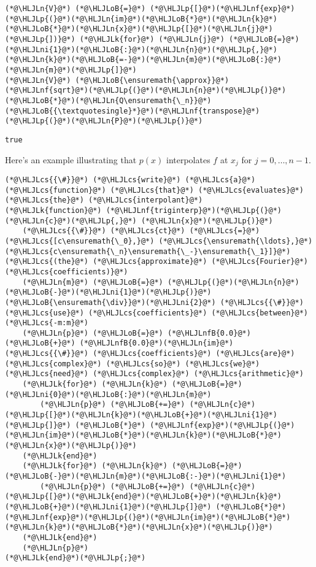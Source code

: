 \documentclass[12pt,a4paper]{article}
\newcommand{\HLJLk}[1]{\textcolor[RGB]{148,91,176}{\textbf{#1}}}
\newcommand{\HLJLn}[1]{#1}
\newcommand{\HLJLnf}[1]{\textcolor[RGB]{66,102,213}{#1}}
\newcommand{\HLJLnfB}[1]{\textcolor[RGB]{59,151,46}{#1}}
\newcommand{\HLJLni}[1]{\textcolor[RGB]{59,151,46}{#1}}
\newcommand{\HLJLoB}[1]{\textcolor[RGB]{102,102,102}{\textbf{#1}}}
\newcommand{\HLJLp}[1]{#1}
\newcommand{\HLJLcs}[1]{\textcolor[RGB]{153,153,119}{\textit{#1}}}
\begin{document}
\begin{lstlisting}
(*@\HLJLn{V}@*) (*@\HLJLoB{=}@*) (*@\HLJLp{[}@*)(*@\HLJLnf{exp}@*)(*@\HLJLp{(}@*)(*@\HLJLn{im}@*)(*@\HLJLoB{*}@*)(*@\HLJLn{k}@*)(*@\HLJLoB{*}@*)(*@\HLJLn{x}@*)(*@\HLJLp{[}@*)(*@\HLJLn{j}@*)(*@\HLJLp{])}@*) (*@\HLJLk{for}@*) (*@\HLJLn{j}@*) (*@\HLJLoB{=}@*) (*@\HLJLni{1}@*)(*@\HLJLoB{:}@*)(*@\HLJLn{n}@*)(*@\HLJLp{,}@*) (*@\HLJLn{k}@*)(*@\HLJLoB{=-}@*)(*@\HLJLn{m}@*)(*@\HLJLoB{:}@*)(*@\HLJLn{m}@*)(*@\HLJLp{]}@*)
(*@\HLJLn{V}@*) (*@\HLJLoB{\ensuremath{\approx}}@*) (*@\HLJLnf{sqrt}@*)(*@\HLJLp{(}@*)(*@\HLJLn{n}@*)(*@\HLJLp{)}@*)(*@\HLJLoB{*}@*)(*@\HLJLn{Q\ensuremath{\_n}}@*)(*@\HLJLoB{{\textquotesingle}*}@*)(*@\HLJLnf{transpose}@*)(*@\HLJLp{(}@*)(*@\HLJLn{P}@*)(*@\HLJLp{)}@*)
\end{lstlisting}

\begin{lstlisting}
true
\end{lstlisting}


Here's an example illustrating that $p(x)$ interpolates $f$ at $x_{j}$ for $j = 0, \ldots, n-1$.


\begin{lstlisting}
(*@\HLJLcs{{\#}}@*) (*@\HLJLcs{write}@*) (*@\HLJLcs{a}@*) (*@\HLJLcs{function}@*) (*@\HLJLcs{that}@*) (*@\HLJLcs{evaluates}@*) (*@\HLJLcs{the}@*) (*@\HLJLcs{interpolant}@*)
(*@\HLJLk{function}@*) (*@\HLJLnf{triginterp}@*)(*@\HLJLp{(}@*)(*@\HLJLn{c}@*)(*@\HLJLp{,}@*) (*@\HLJLn{x}@*)(*@\HLJLp{)}@*)
    (*@\HLJLcs{{\#}}@*) (*@\HLJLcs{ct}@*) (*@\HLJLcs{=}@*) (*@\HLJLcs{[c\ensuremath{\_0},}@*) (*@\HLJLcs{\ensuremath{\ldots},}@*) (*@\HLJLcs{c\ensuremath{\_n}\ensuremath{\_-}\ensuremath{\_1}]}@*) (*@\HLJLcs{(the}@*) (*@\HLJLcs{approximate}@*) (*@\HLJLcs{Fourier}@*) (*@\HLJLcs{coefficients)}@*)
    (*@\HLJLn{m}@*) (*@\HLJLoB{=}@*) (*@\HLJLp{(}@*)(*@\HLJLn{n}@*)(*@\HLJLoB{-}@*)(*@\HLJLni{1}@*)(*@\HLJLp{)}@*)(*@\HLJLoB{\ensuremath{\div}}@*)(*@\HLJLni{2}@*) (*@\HLJLcs{{\#}}@*) (*@\HLJLcs{use}@*) (*@\HLJLcs{coefficients}@*) (*@\HLJLcs{between}@*) (*@\HLJLcs{-m:m}@*)
    (*@\HLJLn{p}@*) (*@\HLJLoB{=}@*) (*@\HLJLnfB{0.0}@*) (*@\HLJLoB{+}@*) (*@\HLJLnfB{0.0}@*)(*@\HLJLn{im}@*) (*@\HLJLcs{{\#}}@*) (*@\HLJLcs{coefficients}@*) (*@\HLJLcs{are}@*) (*@\HLJLcs{complex}@*) (*@\HLJLcs{so}@*) (*@\HLJLcs{we}@*) (*@\HLJLcs{need}@*) (*@\HLJLcs{complex}@*) (*@\HLJLcs{arithmetic}@*)
    (*@\HLJLk{for}@*) (*@\HLJLn{k}@*) (*@\HLJLoB{=}@*) (*@\HLJLni{0}@*)(*@\HLJLoB{:}@*)(*@\HLJLn{m}@*)
        (*@\HLJLn{p}@*) (*@\HLJLoB{+=}@*) (*@\HLJLn{c}@*)(*@\HLJLp{[}@*)(*@\HLJLn{k}@*)(*@\HLJLoB{+}@*)(*@\HLJLni{1}@*)(*@\HLJLp{]}@*) (*@\HLJLoB{*}@*) (*@\HLJLnf{exp}@*)(*@\HLJLp{(}@*)(*@\HLJLn{im}@*)(*@\HLJLoB{*}@*)(*@\HLJLn{k}@*)(*@\HLJLoB{*}@*)(*@\HLJLn{x}@*)(*@\HLJLp{)}@*)
    (*@\HLJLk{end}@*)
    (*@\HLJLk{for}@*) (*@\HLJLn{k}@*) (*@\HLJLoB{=}@*) (*@\HLJLoB{-}@*)(*@\HLJLn{m}@*)(*@\HLJLoB{:-}@*)(*@\HLJLni{1}@*)
        (*@\HLJLn{p}@*) (*@\HLJLoB{+=}@*) (*@\HLJLn{c}@*)(*@\HLJLp{[}@*)(*@\HLJLk{end}@*)(*@\HLJLoB{+}@*)(*@\HLJLn{k}@*)(*@\HLJLoB{+}@*)(*@\HLJLni{1}@*)(*@\HLJLp{]}@*) (*@\HLJLoB{*}@*) (*@\HLJLnf{exp}@*)(*@\HLJLp{(}@*)(*@\HLJLn{im}@*)(*@\HLJLoB{*}@*)(*@\HLJLn{k}@*)(*@\HLJLoB{*}@*)(*@\HLJLn{x}@*)(*@\HLJLp{)}@*)
    (*@\HLJLk{end}@*)
    (*@\HLJLn{p}@*)
(*@\HLJLk{end}@*)(*@\HLJLp{;}@*)
\end{lstlisting}
\end{document}
